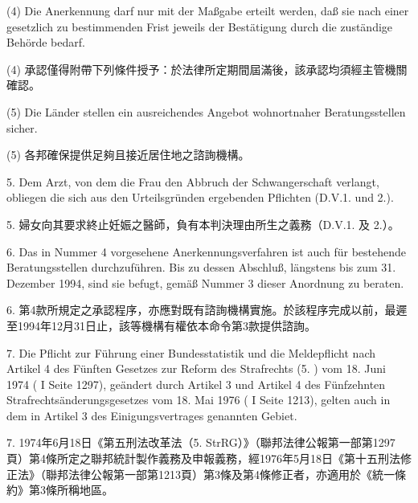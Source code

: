 \documentclass[12pt]{article}
\begin{document}
\begin{sourcepara}[title={原文主文 II.4(4)}]
(4) Die Anerkennung darf nur mit der Maßgabe erteilt werden, daß sie nach einer gesetzlich zu bestimmenden Frist jeweils der Bestätigung durch die zuständige Behörde bedarf.
\end{sourcepara}
\begin{transpara}
(4) 承認僅得附帶下列條件授予：於法律所定期間屆滿後，該承認均須經主管機關確認。
\end{transpara}

\begin{sourcepara}[title={原文主文 II.4(5)}]
(5) Die Länder stellen ein ausreichendes Angebot wohnortnaher Beratungsstellen sicher.
\end{sourcepara}
\begin{transpara}
(5) 各邦確保提供足夠且接近居住地之諮詢機構。
\end{transpara}

\begin{sourcepara}[title={原文主文 II.5}]
5. Dem Arzt, von dem die Frau den Abbruch der Schwangerschaft verlangt, obliegen die sich aus den Urteilsgründen ergebenden Pflichten (D.V.1. und 2.).
\end{sourcepara}
\begin{transpara}
5. 婦女向其要求終止妊娠之醫師，負有本判決理由所生之義務（D.V.1. 及 2.）。
\end{transpara}

\begin{sourcepara}[title={原文主文 II.6}]
6. Das in Nummer 4 vorgesehene Anerkennungsverfahren ist auch für bestehende Beratungsstellen durchzuführen. Bis zu dessen Abschluß, längstens bis zum 31. Dezember 1994, sind sie befugt, gemäß Nummer 3 dieser Anordnung zu beraten.
\end{sourcepara}
\begin{transpara}
6. 第4款所規定之承認程序，亦應對既有諮詢機構實施。於該程序完成以前，最遲至1994年12月31日止，該等機構有權依本命令第3款提供諮詢。
\end{transpara}

\begin{sourcepara}[title={原文主文 II.7}]
7. Die Pflicht zur Führung einer Bundesstatistik und die Meldepflicht nach Artikel 4 des Fünften Gesetzes zur Reform des Strafrechts (5. \abbrStrRG{}) vom 18. Juni 1974 (\abbrBundesgesetzbl{} I Seite 1297), geändert durch Artikel 3 und Artikel 4 des Fünfzehnten Strafrechtsänderungsgesetzes vom 18. Mai 1976 (\abbrBundesgesetzbl{} I Seite 1213), gelten auch in dem in Artikel 3 des Einigungsvertrages genannten Gebiet.
\end{sourcepara}
\begin{transpara}
7. 1974年6月18日《第五刑法改革法（5. StrRG）》（聯邦法律公報第一部第1297頁）第4條所定之聯邦統計製作義務及申報義務，經1976年5月18日《第十五刑法修正法》（聯邦法律公報第一部第1213頁）第3條及第4條修正者，亦適用於《統一條約》第3條所稱地區。
\end{transpara}
\end{document}
